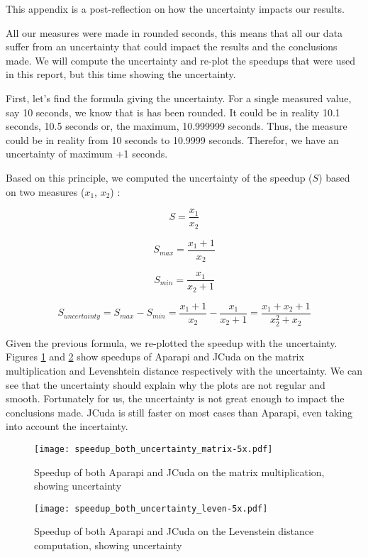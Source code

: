 This appendix is a post-reflection on how the uncertainty impacts our results.

All our measures were made in rounded seconds, this means that all our data suffer from an uncertainty that could impact the results and the conclusions made. We will compute the uncertainty and re-plot the speedups that were used in this report, but this time showing the uncertainty.

First, let's find the formula giving the uncertainty. For a single measured value, say 10 seconds, we know that is has been rounded. It could be in reality 10.1 seconds, 10.5 seconds or, the maximum, 10.999999 seconds. Thus, the measure could be in reality from 10 seconds to 10.9999 seconds. Therefor, we have an uncertainty of maximum +1 seconds.

Based on this principle, we computed the uncertainty of the speedup ($S$) based on two measures ($x_1$, $x_2$) :

\[ S = \frac{x_1}{x_2} \]

\[ S_{max} = \frac{x_1+1}{x_2} \]

\[ S_{min} = \frac{x_1}{x_2+1} \]

\[ S_{uncertainty} = S_{max} - S_{min} = \frac{x_1+1}{x_2} - \frac{x_1}{x_2+1} = \frac{x_1+x_2+1}{x_2^2+x_2} \]

Given the previous formula, we re-plotted the speedup with the uncertainty. Figures \ref{fig: plot both matrix uncertain} and \ref{fig: plot both leven uncertain} show speedups of Aparapi and JCuda on the matrix multiplication and Levenshtein distance respectively with the uncertainty. We can see that the uncertainty should explain why the plots are not regular and smooth. Fortunately for us, the uncertainty is not great enough to impact the conclusions made. JCuda is still faster on most cases than Aparapi, even taking into account the incertainty.

\begin{figure}[H]
\centering
\texttt{[image: speedup\_both\_uncertainty\_matrix-5x.pdf]}
\caption{Speedup of both Aparapi and JCuda on the matrix multiplication, showing uncertainty}
\label{fig: plot both matrix uncertain}
\end{figure}

\begin{figure}[H]
\centering
\texttt{[image: speedup\_both\_uncertainty\_leven-5x.pdf]}
\caption{Speedup of both Aparapi and JCuda on the Levenstein distance computation, showing uncertainty}
\label{fig: plot both leven uncertain}
\end{figure}